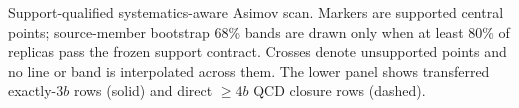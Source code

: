 Support-qualified systematics-aware Asimov scan. Markers are supported central points; source-member bootstrap 68\% bands are drawn only when at least 80\% of replicas pass the frozen support contract. Crosses denote unsupported points and no line or band is interpolated across them. The lower panel shows transferred exactly-$3b$ rows (solid) and direct $\geq4b$ QCD closure rows (dashed).
